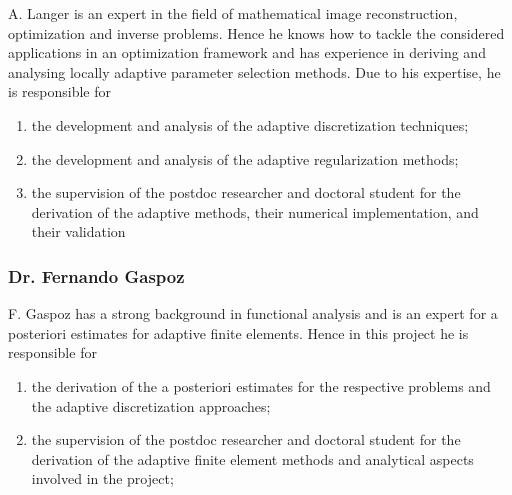 \documentclass[enabledeprecatedfontcommands,cleardoublepage=empty,headsepline,twoside,11pt,DIV=15,BCOR=12mm,final]{scrartcl}
\begin{document}
A. Langer is an expert in the field of mathematical image reconstruction, optimization and inverse problems. Hence he knows how to tackle the considered applications in an optimization framework and has experience in deriving and analysing locally adaptive parameter selection methods. Due to his expertise, he is responsible for 
\begin{enumerate}[(1)]
\item the development and analysis of the adaptive discretization techniques;
\item the development and analysis of the adaptive regularization methods;
\item the supervision of the postdoc researcher and doctoral student for the derivation of the adaptive methods, their numerical implementation, and their validation  
\end{enumerate} 



\subsubsection{Dr. Fernando Gaspoz}
F. Gaspoz has a strong background in functional analysis and is an expert for a posteriori estimates for adaptive finite elements. Hence in this project he is responsible for 
\begin{enumerate}[(1)]
\item  the derivation of the a posteriori estimates for the respective problems and the adaptive discretization approaches;
\item the supervision of the postdoc researcher and doctoral student for the derivation of the adaptive finite element methods and analytical aspects involved in the project;
\end{enumerate}
\end{document}
